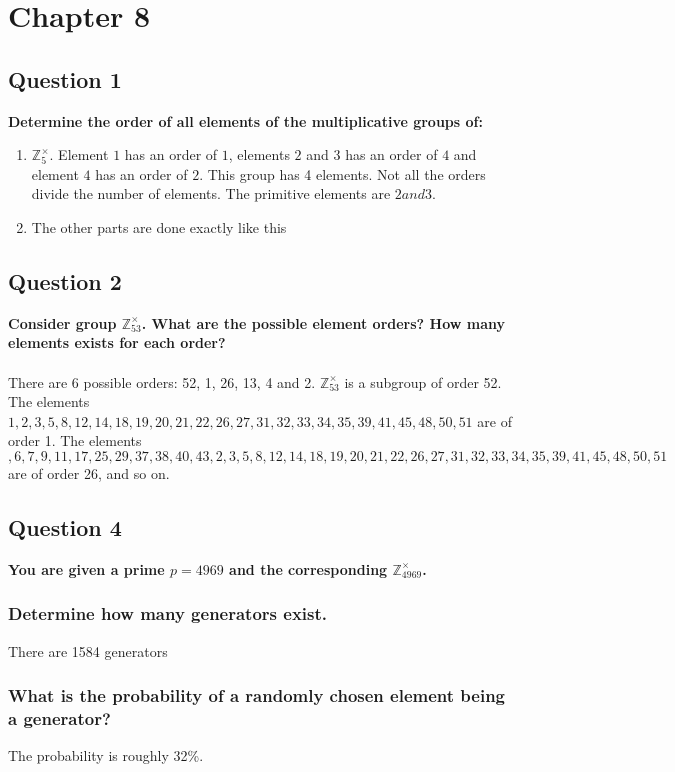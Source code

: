 \documentclass[titlepage]{article}
\begin{document}
\section{Chapter 8}
{
\subsection{Question 1}
{
\textbf{Determine the order of all elements of the multiplicative groups of:}
\begin{enumerate}
    \item \(\mathbb{Z}_5^{\times}\). Element \(1\) has an order of \(1\), elements \(2\) and \(3\) has an order of \(4\) and element \(4\) has an order of \(2\). This group has 4 elements. Not all the orders divide the number of elements. The primitive elements are \(2 and 3\). 
    \item The other parts are done exactly like this
\end{enumerate}
}
\subsection{Question 2}
{
\textbf{Consider group \(\mathbb{Z}_{53}^{\times}\). What are the possible element orders? How many elements exists for each order?}\\\\There are 6 possible orders: 52, 1, 26, 13, 4 and 2. \(\mathbb{Z}_{53}^{\times}\) is a subgroup of order 52. The elements \(1, 2, 3, 5, 8, 12, 14, 18, 19, 20, 21, 22, 26, 27, 31, 32, 33, 34, 35, 39, 41, 45, 48, 50, 51\) are of order 1. The elements \(, 6, 7, 9, 11, 17, 25, 29, 37, 38, 40, 43, 2, 3, 5, 8, 12, 14, 18, 19, 20, 21, 22, 26, 27, 31, 32, 33, 34, 35, 39, 41, 45, 48, 50, 51\) are of order 26, and so on.
}
\subsection{Question 4}
{
\textbf{You are given a prime \(p = 4969\) and the corresponding \(\mathbb{Z}_{4969}^{\times}\).}
\subsubsection{Determine how many generators exist.}
{
There are 1584 generators
}
\subsubsection{What is the probability of a randomly chosen element being a generator?}
{
The probability is roughly 32\%.
}
}
}
\end{document}
